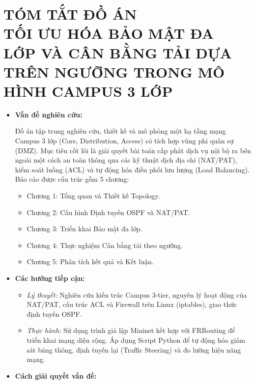 \section*{TÓM TẮT ĐỒ ÁN\\TỐI ƯU HÓA BẢO MẬT ĐA LỚP VÀ CÂN BẰNG TẢI DỰA TRÊN NGƯỠNG TRONG MÔ HÌNH CAMPUS 3 LỚP}

\begin{itemize}
    \item \textbf{Vấn đề nghiên cứu:}
    
    Đồ án tập trung nghiên cứu, thiết kế và mô phỏng một hạ tầng mạng Campus 3 lớp (Core, Distribution, Access) có tích hợp vùng phi quân sự (DMZ). Mục tiêu cốt lõi là giải quyết bài toán cấp phát dịch vụ nội bộ ra bên ngoài một cách an toàn thông qua các kỹ thuật dịch địa chỉ (NAT/PAT), kiểm soát luồng (ACL) và tự động hóa điều phối lưu lượng (Load Balancing). Báo cáo được cấu trúc gồm 5 chương:
    
        \begin{itemize}
        \item[--] Chương 1: Tổng quan và Thiết kế Topology.
        \item[--] Chương 2: Cấu hình Định tuyến OSPF và NAT/PAT.
        \item[--] Chương 3: Triển khai Bảo mật đa lớp.
        \item[--] Chương 4: Thực nghiệm Cân bằng tải theo ngưỡng.
        \item[--] Chương 5: Phân tích kết quả và Kết luận.
        \end{itemize}
        
    \item \textbf{Các hướng tiếp cận:}
    
        \begin{itemize}
        \item[--] \textit{Lý thuyết:} Nghiên cứu kiến trúc Campus 3-tier, nguyên lý hoạt động của NAT/PAT, cấu trúc ACL và Firewall trên Linux (iptables), giao thức định tuyến OSPF.
        
        \item[--] \textit{Thực hành:} Sử dụng trình giả lập Mininet kết hợp với FRRouting để triển khai mạng diện rộng. Áp dụng Script Python để tự động hóa giám sát băng thông, định tuyến lại (Traffic Steering) và đo lường hiệu năng mạng.
        \end{itemize}
        
    \item \textbf{Cách giải quyết vấn đề:}
    

\end{itemize}
